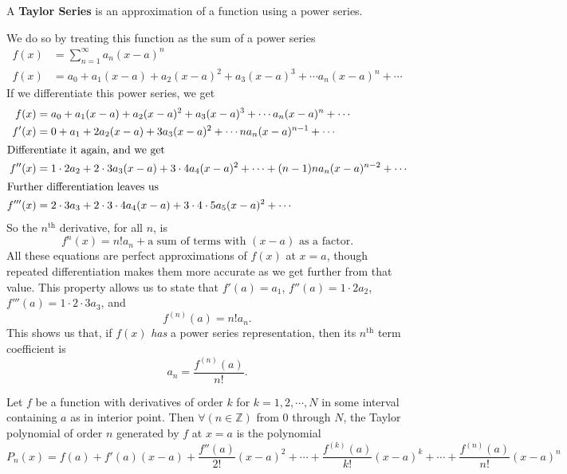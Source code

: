 A \textbf{Taylor Series} is an approximation of a function using a power series.

  We do so by treating this function as the sum of a power series
  \begin{align*}
    f(x) &= \sum^\infty_{n=1} a_n(x-a)^n \\
    f(x) &= a_0+a_1(x-a)+a_2 (x-a)^2 + a_3 (x-a)^3 + \cdots a_n (x-a)^n + \cdots
  \end{align*}
  If we differentiate this power series, we get
  \begin{align*}
    f(x) &= a_0+a_1(x-a)+a_2 (x-a)^2 + a_3 (x-a)^3 + \cdots a_n (x-a)^n + \cdots \\
    f'(x) &= 0+a_1+2a_2 (x-a) +3 a_3 (x-a)^2 + \cdots n a_n (x-a)^{n-1} + \cdots \\
    \intertext{Differentiate it again, and we get}
    f''(x) &= 1 \cdot 2a_2+2 \cdot 3 a_3 (x-a) + 3 \cdot 4 a_4 (x-a)^2 + \cdots + (n-1)n a_n (x-a)^{n-2} + \cdots \\
    \intertext{Further differentiation leaves us}
    f'''(x) &= 2 \cdot 3 a_3 + 2 \cdot 3 \cdot 4 a_4 (x-a) + 3 \cdot 4 \cdot 5 a_5 (x-a)^2 + \cdots
  \end{align*}
  So the $n^\textrm{th}$ derivative, for all $n$, is
  \[ f^n(x) = n! a_n + \textrm{a sum of terms with $(x-a)$ as a factor.} \]
  All these equations are perfect approximations of $f(x)$ at $x=a$, though repeated differentiation makes them more accurate as we get further from that value.
  This property allows us to state that $f'(a)=a_1$, $f''(a)=1 \cdot 2 a_2$, $f'''(a)=1 \cdot 2 \cdot 3 a_3$, and
  \[ f^{(n)}(a) = n! a_n.\]
  This shows us that, if $f(x)$ \emph{has} a power series representation, then its $n^\textrm{th}$ term coefficient is
  \[ a_n = \frac{f^{(n)}(a)}{n!}. \]
  \cite[p. 584]{thomas}

  \begin{theorem}
    Let $f$ be a function with derivatives of order $k$ for $k=1, 2, \cdots, N$ in some interval containing $a$ as in interior point.
    Then $\forall (n\in \mathbb{Z})$ from $0$ through $N$, the Taylor polynomial of order $n$ generated by $f$ at $x=a$ is the polynomial
    \begin{equation}
      P_n(x)=f(a)+f'(a)(x-a)+\frac{f''(a)}{2!}(x-a)^2+\cdots+\frac{f^{(k)}(a)}{k!}(x-a)^k+\cdots+\frac{f^{(n)}(a)}{n!}(x-a)^n
    \end{equation}
    \cite[p. 586]{thomas}
    \label{th:taylor}
  \end{theorem}

